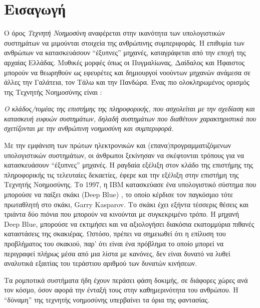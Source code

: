 \chapter{Εισαγωγή}
\label{chapter:intro}

Ο όρος \emph{Τεχνητή Νοημοσύνη} αναφέρεται στην ικανότητα των υπολογιστικών
συστημάτων να μιμούνται στοιχεία της ανθρώπινης συμπεριφοράς.
Η επιθυμία των ανθρώπων να κατασκευάσουν “έξυπνες” μηχανές, καταγράφεται από
την εποχή της αρχαίας Ελλάδας. Μυθικές μορφές όπως οι Πυγμαλίωνας, Δαίδαλος και
Ήφαιστος μπορούν να θεωρηθούν ως εφευρέτες και δημιουργοί νοούντων
μηχανών ανάμεσα σε άλλες την Γαλάτεια, τον Τάλω και την Πανδώρα.
Ένας πιο ολοκληρωμένος ορισμός της Τεχνητής Νοημοσύνης είναι \cite{barr1989handbook}:
\begin{displayquote}
\emph{
  Ο κλάδος/τομέας της επιστήμης της πληροφορικής, που ασχολείται
  με την σχεδίαση και κατασκευή ευφυών συστημάτων, δηλαδή συστημάτων που
  διαθέτουν χαρακτηριστικά που σχετίζονται με την ανθρώπινη νοημοσύνη και συμπεριφορά.
}
\end{displayquote}

Με την εμφάνιση των πρώτων ηλεκτρονικών και (επανα)προγραμματιζόμενων υπολογιστικών συστημάτων,
οι άνθρωποι ξεκίνησαν να σκέφτονται τρόπους για να κατασκευάσουν “έξυπνες” μηχανές.
H ραγδαία εξέλιξη στον κλάδο της επιστήμης της πληροφορικής τις τελευταίες
δεκαετίες, έφερε και την εξέλιξη στην επιστήμη της Τεχνητής Νοημοσύνης.
Το 1997, η IBM κατασκεύασε ένα υπολογιστικό σύστημα που μπορούσε να
παίξει σκάκι (Deep Blue) \cite{campbell2002deep}, το οποίο κέρδισε τον παγκόσμιο %
τότε πρωταθλητή στο σκάκι, Garry Kasparov. Το σκάκι έχει εξήντα τέσσερις θέσεις
και τριάντα δύο πιόνια που μπορούν να κινούνται με συγκεκριμένο τρόπο. H μηχανή
Deep Blue, μπορούσε να εκτιμήσει και να αξιολογήσει διακόσια εκατομμύρια
πιθανές καταστάσεις της σκακιέρας. Ωστόσο, πρέπει να σημειωθεί ότι η επίλυση του
προβλήματος του σκακιού, παρ' ότι είναι ένα πρόβλημα το οποίο μπορεί να περιγραφεί
πλήρως μέσα από μια λίστα με κανόνες, δεν είναι δυνατό να λυθεί αναλυτικά εξαιτίας
του τεράστιου αριθμού των δυνατών κινήσεων.

Τα ρομποτικά συστήματα ήδη έχουν περάσει φάση δοκιμής, σε διάφορες χώρες ανά τον
κόσμο, όσον αφορά την ένταξή τους στην καθημερινότητα του ανθρώπου.
Η “δύναμη” της τεχνητής νοημοσύνης υπερβαίνει τα όρια της φαντασίας.

